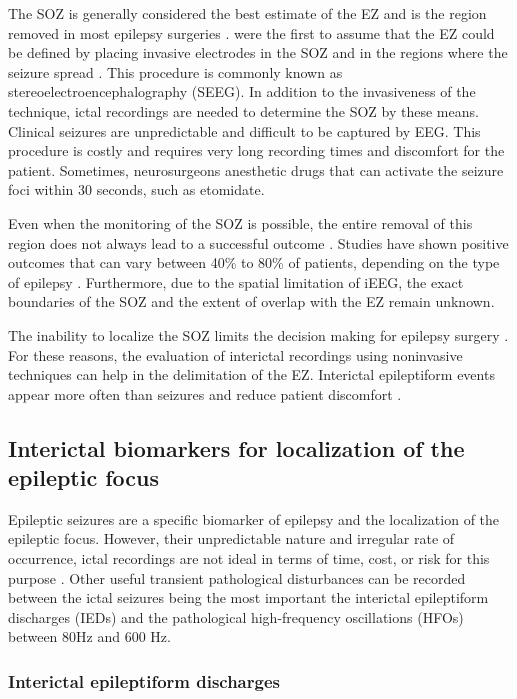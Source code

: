 The SOZ is generally considered the best estimate of the EZ and is the region removed in most epilepsy surgeries \citep{Luders2006}. \citet{Talairach1973} were the first to assume that the EZ could be defined by placing invasive electrodes in the SOZ and in the regions where the seizure spread \citep{Talairach1966}. This procedure is commonly known as stereoelectroencephalography (SEEG). In addition to the invasiveness of the technique, ictal recordings are needed to determine the SOZ by these means. Clinical seizures are unpredictable and difficult to be captured by EEG. This procedure is costly and requires very long recording times and discomfort for the patient. Sometimes, neurosurgeons anesthetic drugs that can activate the seizure foci within 30 seconds, such as etomidate\citep{Ebrahim1986}.

Even when the monitoring of the SOZ is possible, the entire removal of this region does not always lead to a successful outcome  \citep{Rummel2015}. Studies have shown positive outcomes that can vary between 40\% to 80\% of patients, depending on the type of epilepsy \citep{Schulze2014}. Furthermore, due to the spatial limitation of iEEG, the exact boundaries of the SOZ and the extent of overlap with the EZ remain unknown. 

The inability to localize the SOZ limits the decision making for epilepsy surgery \citep{Berg2003,Uijl2005}. For these reasons, the evaluation of interictal recordings using noninvasive techniques can help in the delimitation of the EZ. Interictal epileptiform events appear more often than seizures and reduce patient discomfort \citep{Staba2014}.

\subsection{Interictal biomarkers for localization of the epileptic focus}

Epileptic seizures are a specific biomarker of epilepsy and the localization of the epileptic focus. However,  their unpredictable nature and irregular rate of occurrence, ictal recordings are not ideal in terms of time, cost, or risk for this purpose \citep{Staba2014}. Other useful transient pathological disturbances can be recorded between the ictal seizures being the most important the interictal epileptiform discharges (IEDs) and the pathological high-frequency oscillations (HFOs) between 80Hz and 600 Hz. 

\subsubsection{Interictal epileptiform discharges}

